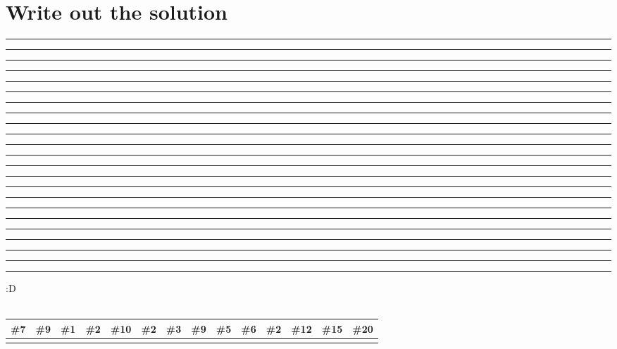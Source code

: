 \documentclass[12pt]{article}
\begin{document}
\section*{Write out the solution}
\noindent 
\rule{0.4cm}{0.4pt} \rule{0.4cm}{0.4pt} \rule{0.4cm}{0.4pt} 
\quad 
\rule{0.4cm}{0.4pt} 
\quad 
\rule{0.4cm}{0.4pt} \rule{0.4cm}{0.4pt} \rule{0.4cm}{0.4pt} \rule{0.4cm}{0.4pt} 
\quad
\rule{0.4cm}{0.4pt} \rule{0.4cm}{0.4pt} \rule{0.4cm}{0.4pt}
\quad 
\rule{0.4cm}{0.4pt} \rule{0.4cm}{0.4pt} \rule{0.4cm}{0.4pt} \rule{0.4cm}{0.4pt} \rule{0.4cm}{0.4pt} 
\quad 
\rule{0.4cm}{0.4pt} \rule{0.4cm}{0.4pt} \rule{0.4cm}{0.4pt} \rule{0.4cm}{0.4pt} \rule{0.4cm}{0.4pt} \rule{0.4cm}{0.4pt} 
\quad 
\rule{0.4cm}{0.4pt} :D
\\\\
\noindent %
\begin{tabular}{|*{14}{W|}} 
\hline
\textbf{\#7} & \textbf{\#9} & \textbf{\#1} & \textbf{\#2} & 
\textbf{\#10} & \textbf{\#2} & \textbf{\#3} & \textbf{\#9} & 
\textbf{\#5} & \textbf{\#6} & \textbf{\#2} & 
\textbf{\#12} & \textbf{\#15} & \textbf{\#20} \\

\hline
& & & & & & & & & & & & & \\
\hline
\end{tabular}

\vspace{1em} %
\end{document}
